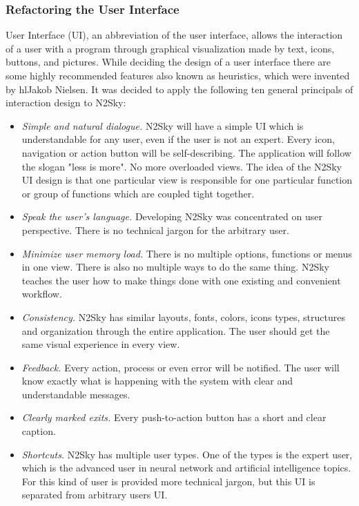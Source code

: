 \subsubsection{Refactoring the User Interface}\label{Refactoring the User Interface}

User Interface (UI), an abbreviation of the user interface, allows the interaction of a user with a program through graphical visualization made by text, icons, buttons, and pictures. While deciding the design of a user interface there are some highly recommended features also known as heuristics, which were invented by hl{Jakob Nielsen}. It was decided to apply the following ten general principals of interaction design to N2Sky:

\begin{itemize}
\item \emph{Simple and natural dialogue.} N2Sky will have a simple UI which is understandable for any user, even if the user is not an expert. Every icon, navigation or action button will be self-describing. The application will follow the slogan "less is more". No more overloaded views. The idea of the N2Sky UI design is that one particular view is responsible for one particular function or group of functions which are coupled tight together.
\item \emph{Speak the user's language.} Developing N2Sky was concentrated on user perspective. There is no technical jargon for the arbitrary user.
\item \emph{Minimize user memory load.} There is no multiple options, functions or menus in one view. There is also no multiple ways to do the same thing. N2Sky teaches the user how to make things done with one existing and convenient workflow. 
\item \emph{Consistency.} N2Sky has similar layouts, fonts, colors, icons types, structures and organization through the entire application. The user should get the same visual experience in every view.
\item \emph{Feedback.} Every action, process or even error will be notified. The user will know exactly what is happening with the system with clear and understandable messages.
\item \emph{Clearly marked exits.} Every push-to-action button has a short and clear caption.
\item \emph{Shortcuts.} N2Sky has multiple user types. One of the types is the expert user, which is the advanced user in neural network and artificial intelligence topics. For this kind of user is provided more technical jargon, but this UI is separated from arbitrary users UI.  

\end{itemize}
